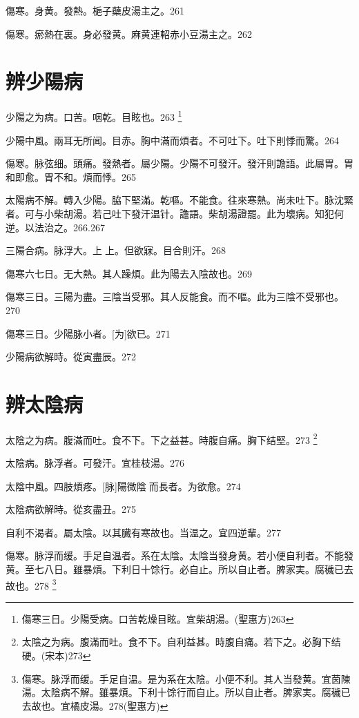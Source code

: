 \documentclass[oneside,b4paper]{ctexbook}
\begin{document}
\begin{flushleft}
傷寒。身黄。發熱。梔子蘗皮湯主之。261

傷寒。瘀熱在裏。身必發黄。麻黄連軺赤小豆湯主之。262

\chapter{辨少陽病}

少陽之为病。口苦。咽乾。目眩也。263
\footnote{傷寒三日。少陽受病。口苦乾燥目眩。宜柴胡湯。(聖惠方)263}

少陽中風。兩耳无所闻。目赤。胸中滿而煩者。不可吐下。吐下則悸而驚。264

傷寒。脉弦细。頭痛。發熱者。屬少陽。少陽不可發汗。發汗則譫語。此屬胃。胃和即愈。胃不和。煩而悸。265

太陽病不解。轉入少陽。脇下堅滿。乾嘔。不能食。往來寒熱。尚未吐下。脉沈緊者。可与小柴胡湯。若己吐下發汗温针。譫語。柴胡湯證罷。此为壞病。知犯何逆。以法治之。266.267

三陽合病。脉浮大。上{𬮦}上。但欲寐。目合則汗。268

傷寒六七日。无大熱。其人躁煩。此为陽去入陰故也。269

傷寒三日。三陽为盡。三陰当受邪。其人反能食。而不嘔。此为三陰不受邪也。270

傷寒三日。少陽脉小者。[为]欲已。271

少陽病欲解時。從寅盡辰。272

\chapter{辨太陰病}

太陰之为病。腹滿而吐。食不下。下之益甚。時腹自痛。胸下结堅。273
\footnote{太陰之为病。腹滿而吐。食不下。自利益甚。時腹自痛。若下之。必胸下结硬。(宋本)273}

太陰病。脉浮者。可發汗。宜桂枝湯。276

太陰中風。四肢煩疼。[脉]陽微陰{𬈧}而長者。为欲愈。274

太陰病欲解時。從亥盡丑。275

自利不渴者。屬太陰。以其臓有寒故也。当温之。宜四逆輩。277

傷寒。脉浮而缓。手足自温者。系在太陰。太陰当發身黄。若小便自利者。不能發黄。至七八日。雖暴煩。下利日十馀行。必自止。所以自止者。脾家実。腐穢已去故也。278
\footnote{傷寒。脉浮而缓。手足自温。是为系在太陰。小便不利。其人当發黄。宜茵陳湯。太陰病不解。雖暴煩。下利十馀行而自止。所以自止者。脾家実。腐穢已去故也。宜橘皮湯。278(聖惠方)}


\end{flushleft}
\end{document}
